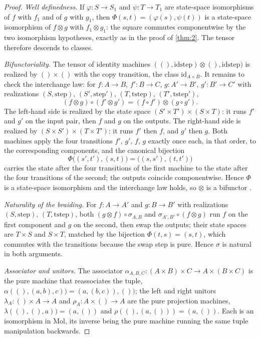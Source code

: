 \begin{proof}
\emph{Well definedness.} If $\varphi : S \to S_1$ and $\psi : T \to T_1$ are
state-space isomorphisms of $f$ with $f_1$ and of $g$ with $g_1$, then
$\Phi (s, t) = (\varphi (s), \psi (t))$ is a state-space isomorphism of
$f \otimes g$ with $f_1 \otimes g_1$: the square commutes componentwise by the
two isomorphism hypotheses, exactly as in the proof of \autoref{thm:2}. The
tensor therefore descends to classes.

\emph{Bifunctoriality.} The tensor of identity machines
$((), \mathrm{idstep}) \otimes (), \mathrm{idstep})$ is realized by
$() \times ()$ with the copy transition, the class
$\mathrm{id}_{A \times B}$. It remains to check the interchange law: for
$f : A \to B$, $f' : B \to C$, $g : A' \to B'$, $g' : B' \to C'$ with
realizations $(S, \mathrm{step})$, $(S', \mathrm{step}')$, $(T, \mathrm{tstep})$,
$(T', \mathrm{tstep}')$,
\[ (f \otimes g) \circ (f' \otimes g')
   = (f \circ f') \otimes (g \circ g') . \]
The left-hand side is realized by the state space
$(S' \times T') \times (S \times T)$: it runs $f'$ and $g'$ on the input pair,
then $f$ and $g$ on the outputs. The right-hand side is realized by
$(S \times S') \times (T \times T')$: it runs $f'$ then $f$, and $g'$ then
$g$. Both machines apply the four transitions $f'$, $g'$, $f$, $g$ exactly
once each, in that order, to the corresponding components, and the canonical
bijection
\[ \Phi\bigl ((s', t'), (s, t)\bigr) = \bigl ((s, s'), (t, t')\bigr) \]
carries the state after the four transitions of the first machine to the
state after the four transitions of the second; the outputs coincide
componentwise. Hence $\Phi$ is a state-space isomorphism and the interchange
law holds, so $\otimes$ is a bifunctor \citep{maclane}.

\emph{Naturality of the braiding.} For $f : A \to A'$ and $g : B \to B'$
with realizations $(S, \mathrm{step})$, $(T, \mathrm{tstep})$, both
$(g \otimes f) \circ \sigma_{A,B}$ and
$\sigma_{A',B'} \circ (f \otimes g)$ run $f$ on the first component and $g$
on the second, then swap the outputs; their state spaces are
$T \times S$ and $S \times T$, matched by the bijection
$\Phi (t, s) = (s, t)$, which commutes with the transitions because the swap
step is pure. Hence $\sigma$ is natural in both arguments.

\emph{Associator and unitors.} The associator
$\alpha_{A,B,C} : (A \times B) \times C \to A \times (B \times C)$ is the pure
machine that reassociates the tuple,
$\alpha ((), (a, b), c)) = (a, (b, c)), ())$; the left and right unitors
$\lambda_A : () \times A \to A$ and $\rho_A : A \times () \to A$ are the pure
projection machines, $\lambda ((), (), a)) = (a, ())$ and
$\rho ((), (a, ())) = (a, ())$. Each is an isomorphism in Mol, its inverse
being the pure machine running the same tuple manipulation backwards.


\end{proof}
